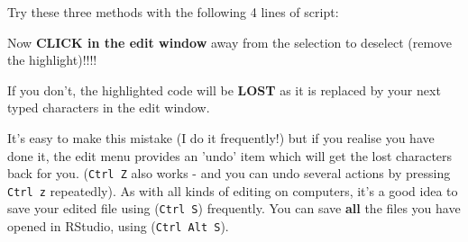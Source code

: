 \documentclass[titlepage]{book}\usepackage{knitr}
\begin{document}
Try these three methods with the following 4 lines of script:

\begin{knitrout}
\color{fgcolor}\begin{kframe}
\begin{alltt}
  \hlcom{#-----------------------------------------------------------------------------------}
\hlstd{(}\hlstd{)}  
 \hlkwb{<-} \hlstd{(}\hlstd{))}   
         
          
\hlcom{#----------------------------------------------------------------------------------}
\end{alltt}
\end{kframe}
\end{knitrout}

  Now \textbf{CLICK in the edit window} away from the selection to deselect (remove the highlight)!!!!

  If you don't, the highlighted code will be \textbf{LOST} as it is replaced by your next typed characters in the edit window.

It's easy to make this mistake (I do it frequently!) but if you realise you have done it, the edit menu provides an 'undo' item which will get the lost characters back for you. (\texttt{Ctrl Z} also works - and you can undo several actions by pressing \texttt{Ctrl z} repeatedly). As with all kinds of editing on computers, it's a good idea to save your edited file using (\texttt{Ctrl S}) frequently. You can save \textbf{all} the files you have opened in RStudio, using (\texttt{Ctrl Alt S}).
\end{document}
